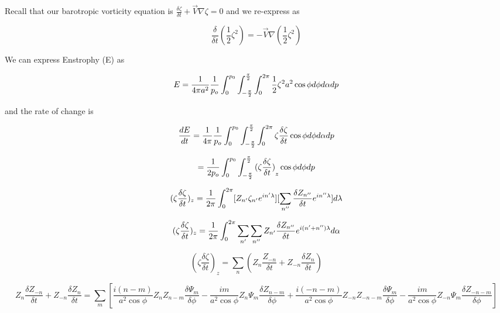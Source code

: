 \documentclass{article}
\begin{document}
Recall that our barotropic vorticity equation is $\frac{\delta \zeta}{\delta t} + \vec{V} \nabla {\zeta} = 0$ and we re-express as

\begin{equation}
\frac{\delta}{\delta t} (\frac{1}{2} \zeta^2 ) = - \vec{V} \nabla (\frac{1}{2} \zeta^2 )
\end{equation}

We can express Enstrophy (E) as

\begin{equation}
E = \frac{1}{4\pi a^2} \frac{1}{p_o} \int_{0}^{p_0} \int_{-\frac{\pi}{2}}^{\frac{\pi}{2}} \int_{0}^{2\pi} \frac{1}{2} \zeta^2 a^2 \cos{\phi} d\phi d\alpha dp
\end{equation}

and the rate of change is

\begin{equation}
\frac{dE}{dt} = \frac{1}{4\pi} \frac{1}{p_o} \int_{0}^{p_0} \int_{-\frac{\pi}{2}}^{\frac{\pi}{2}} \int_{0}^{2\pi} \zeta \frac{\delta \zeta}{\delta t} \cos{\phi} d\phi d\alpha dp
\end{equation}

\begin{equation}
= \frac{1}{2 p_o} \int_{0}^{p_0} \int_{-\frac{\pi}{2}}^{\frac{\pi}{2}} {(\zeta \frac{\delta \zeta}{\delta t})}_z \cos{\phi} d\phi dp
\end{equation}

\begin{equation}
(\zeta \frac{\delta \zeta}{\delta t})_z = \frac{1}{2\pi} \int_{0}^{2\pi} [ Z_{n'} \zeta_{n'} e^{in'\lambda} ] [ \sum_{n''} \frac{\delta Z_{n''}}{\delta t} e^{in''\lambda} ] d\lambda
\end{equation}

\begin{equation}
(\zeta \frac{\delta \zeta}{\delta t})_z = \frac{1}{2\pi} \int_{0}^{2\pi} \sum_{n'} \sum_{n''} Z_{n'} \frac{\delta Z_{n''}}{\delta t} e^{i(n'+n'')\lambda} d\alpha
\end{equation}

\begin{equation}
(\zeta \frac{\delta \zeta}{\delta t})_z = \sum_n (Z_n \frac{Z_{-n}}{\delta t} + Z_{-n} \frac{\delta Z_n}{\delta t} )
\end{equation}

\begin{equation}
Z_n \frac{\delta Z_{-n}}{\delta t} + Z_{-n} \frac{\delta Z_n}{\delta t} = \sum_m [ \frac{i(n-m)}{a^2 \cos{\phi}} Z_n Z_{n-m} \frac{\delta \Psi_m}{\delta \phi} - \frac{im}{a^2 \cos{\phi}} Z_n \Psi_m \frac{\delta Z_{n-m}}{\delta \phi} + \frac{i(-n-m)}{a^2 \cos{\phi}} Z_{-n} Z_{-n-m} \frac{\delta \Psi_m}{\delta \phi} - \frac{im}{a^2 \cos{\phi}} Z_{-n} \Psi_m \frac{\delta Z_{-n-m}}{\delta \phi} ]
\end{equation}
\end{document}
